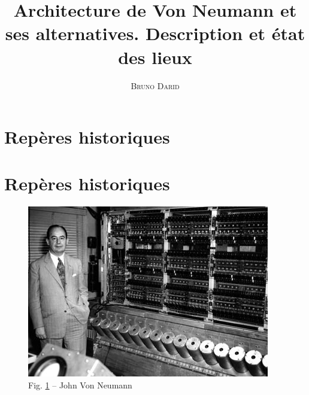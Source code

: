 \documentclass[11pt,french]{article}
\title{Architecture de Von Neumann et ses alternatives. Description et état des lieux}
\author{\textsc{Bruno Darid}}
\makeatletter
\def\maxwidth{\ifdim\Gin@nat@width>\linewidth\linewidth
    \else\Gin@nat@width\fi}
\let\Oldincludegraphics\includegraphics
\renewcommand{\includegraphics}[1]{\Oldincludegraphics[width=.8\maxwidth]{#1}}
\makeatother
\begin{document}
    \renewcommand{\contentsname}{\textsc{Plan}}    
 	\maketitle
 	\tableofcontents
    
    

    
    \hypertarget{repuxe8res-historiques}{%
\section{Repères historiques}\label{repuxe8res-historiques}}


\hypertarget{repuxe8res-historiques}{%
\section{Repères historiques}\label{repuxe8res-historiques}}
\begin{figure}[h]
	\begin{center}
		\includegraphics{../img/IAS_von_Neumann.jpg}
	\end{center}
	\caption{Fig. \ref{fig:vonneumann} -- John Von Neumann}
	\label{fig:vonneumann}
\end{figure}
	
\end{document}
